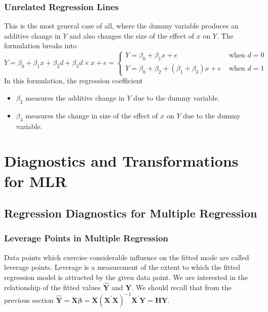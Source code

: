 \documentclass[10pt]{article}
\begin{document}
\subsubsection{Unrelated Regression Lines} 
This is the most general case of all, where the dummy variable produces an additive change in $Y$ and also changes the size of the effect of $x$ on $Y$. The formulation breaks into
\begin{equation*}
    Y=\beta_{0}+\beta_{1} x+\beta_{2} d+\beta_{3} d \times x+e = \left\{\begin{array}{ll}{ Y=\beta_{0}+\beta_{1} x+e} & {\text { when } d=0} \\ {Y=\beta_{0}+\beta_{2}+\left(\beta_{1}+\beta_{3}\right) x+e} & {\text { when } d=1}\end{array}\right.
\end{equation*}
In this formulation, the regression coefficient 
\begin{itemize}
    \item $\beta_2$ measures the additive change in $Y$ due to the dummy variable.
    \item $\beta_3$ measures the change in size of the effect of $x$ on $Y$ due to the dummy variable. 
\end{itemize}

\section{Diagnostics and Transformations for MLR}
\subsection{Regression Diagnostics for Multiple Regression}
\subsubsection{Leverage Points in Multiple Regression}
\color{BurntOrange}
Data points which exercise considerable influence on the fitted mode are called leverage points. Leverage is a measurement of the extent to which the fitted regression model is attracted by the given data point. We are interested in the relationship of the fitted values $\hat{\mathbf{Y}}$ and $\mathbf{Y}$.
\color{Black}
We should recall that from the previous section $\hat{\mathbf{Y}}=\mathbf{X} \hat{\boldsymbol{\beta}}=\mathbf{X}\left(\mathbf{X}^{\prime} \mathbf{X}\right)^{-1} \mathbf{X}^{\prime} \mathbf{Y}=\mathbf{H} \mathbf{Y}$. 
\end{document}
